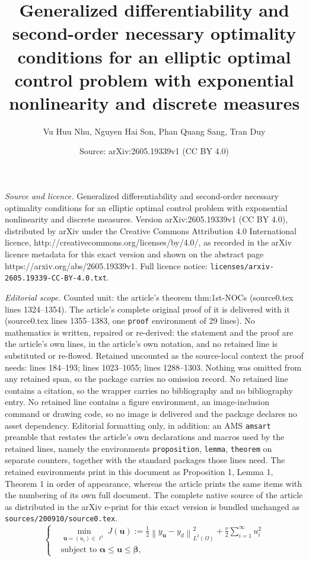 \documentclass[10pt,a4paper]{amsart}
\title{Generalized differentiability and second-order necessary optimality conditions for an elliptic optimal control problem with exponential nonlinearity and discrete measures}
\author{Vu Huu Nhu, Nguyen Hai Son, Phan Quang Sang, Tran Duy}
\date{Source: arXiv:2605.19339v1 (CC BY 4.0)}
\newcommand{\norm}[1]{\left\|#1\right\|}
\begin{document}
\maketitle

\noindent\emph{Source and licence.} Generalized differentiability and second-order necessary optimality conditions for an elliptic optimal control problem with exponential nonlinearity and discrete measures. Version arXiv:2605.19339v1 (CC BY 4.0), distributed by arXiv under the Creative Commons Attribution 4.0 International licence, http://creativecommons.org/licenses/by/4.0/, as recorded in the arXiv licence metadata for this exact version and shown on the abstract page https://arxiv.org/abs/2605.19339v1. Full licence notice: \texttt{licenses/arxiv-2605.19339-CC-BY-4.0.txt}.\par\smallskip

\noindent\textit{Editorial scope.} Counted unit: the article's theorem thm:1st-NOCs (source0.tex lines 1324--1354). The article's complete original proof of it is delivered with it (source0.tex lines 1355--1383, one \texttt{proof} environment of 29 lines). No mathematics is written, repaired or re-derived: the statement and the proof are the article's own lines, in the article's own notation, and no retained line is substituted or re-flowed.  Retained uncounted as the source-local context the proof needs: lines 184--193; lines 1023--1055; lines 1288--1303.  Nothing was omitted from any retained span, so the package carries no omission record.  No retained line contains a citation, so the wrapper carries no bibliography and no bibliography entry.  No retained line contains a figure environment, an image-inclusion command or drawing code, so no image is delivered and the package declares no asset dependency.  Editorial formatting only, in addition: an AMS \texttt{amsart} preamble that restates the article's own declarations and macros used by the retained lines, namely the environments \texttt{proposition}, \texttt{lemma}, \texttt{theorem} on separate counters, together with the standard packages those lines need.  The retained environments print in this document as Proposition 1, Lemma 1, Theorem 1 in order of appearance, whereas the article prints the same items with the numbering of its own full document.  The complete native source of the article as distributed in the arXiv e-print for this exact version is bundled unchanged as \texttt{sources/200910/source0.tex}.
\begin{equation}
	\label{eq:P}
	\tag{P}
	\left\{
	\begin{aligned}
		& \min\limits_{\bm{u} = (u_i) \in \ell^1} J(\bm{u}) := \frac{1 }{2} \norm{y_{\bm{u}} - y_d}_{L^2(\Omega)}^2 + \frac{\nu }{2} \sum_{i=1}^\infty u_i^2 \\
		& \text{subject to } \bm{\alpha} \leq \bm{u} \leq \bm{\beta},
	\end{aligned}
	\right.
\end{equation}
\end{document}
